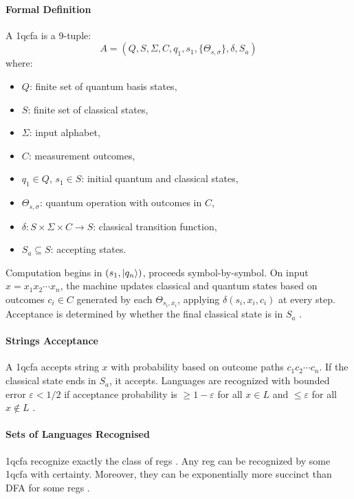\paragraph{Formal Definition}  
A \gls{1qcfa} is a 9-tuple:
\[
A = (Q, S, \Sigma, C, q_1, s_1, \{\Theta_{s,\sigma}\}, \delta, S_a)
\]
where:
\begin{itemize}
    \item $Q$: finite set of quantum basis states,
    \item $S$: finite set of classical states,
    \item $\Sigma$: input alphabet,
    \item $C$: measurement outcomes,
    \item $q_1 \in Q$, $s_1 \in S$: initial quantum and classical states,
    \item $\Theta_{s,\sigma}$: quantum operation with outcomes in $C$,
    \item $\delta: S \times \Sigma \times C \to S$: classical transition function,
    \item $S_a \subseteq S$: accepting states.
\end{itemize}
Computation begins in $(s_1, \ket{q_n})$, proceeds symbol-by-symbol. On input $x = x_1x_2\cdots x_n$, the machine updates classical and quantum states based on outcomes $c_i \in C$ generated by each $\Theta_{s_i,x_i}$, applying $\delta(s_i,x_i,c_i)$ at every step. Acceptance is determined by whether the final classical state is in $S_a$ \cite{li2015hybrid}.

\paragraph{Strings Acceptance}  
A \gls{1qcfa} accepts string $x$ with probability based on outcome paths $c_1c_2\cdots c_n$. If the classical state ends in $S_a$, it accepts. Languages are recognized with bounded error $\varepsilon < 1/2$ if acceptance probability is $\geq 1-\varepsilon$ for all $x \in L$ and $\leq \varepsilon$ for all $x \notin L$ \cite{li2015hybrid, zheng2012one}.

\paragraph{Sets of Languages Recognised}  
\gls{1qcfa} recognize exactly the class of \glspl{reg} \cite{zheng2012one}. Any \gls{reg} can be recognized by some \gls{1qcfa} with certainty. Moreover, they can be exponentially more succinct than DFA for some \glspl{reg} \cite{xiao2021state}.

